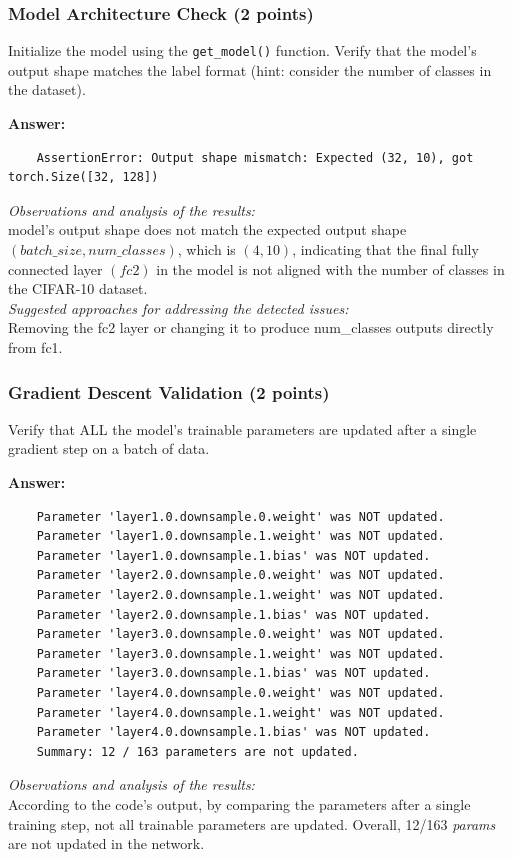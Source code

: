 \documentclass[11pt, oneside]{article}   	%
\begin{document}
\subsubsection*{Model Architecture Check (2 points)}
Initialize the model using the \texttt{get\_model()} function. Verify that the model’s output shape matches the label format (hint: consider the number of classes in the dataset).

\textbf{Answer:} 
\begin{verbatim}
    AssertionError: Output shape mismatch: Expected (32, 10), got torch.Size([32, 128])
\end{verbatim}
\textit{Observations and analysis of the results: }
\\
model's output shape does not match the expected output shape $(batch\_size, num\_classes)$, which is $(4, 10)$, indicating that the final fully connected layer $(fc2)$ in the model is not aligned with the number of classes in the CIFAR-10 dataset.
\\
\textit{Suggested approaches for addressing the detected issues: }
\\
Removing the fc2 layer or changing it to produce num\_classes outputs directly from fc1.

\subsubsection*{Gradient Descent Validation (2 points)}
Verify that ALL the model's trainable parameters are updated after a single gradient step on a batch of data.

\textbf{Answer:}
\begin{verbatim}
    Parameter 'layer1.0.downsample.0.weight' was NOT updated.
    Parameter 'layer1.0.downsample.1.weight' was NOT updated.
    Parameter 'layer1.0.downsample.1.bias' was NOT updated.
    Parameter 'layer2.0.downsample.0.weight' was NOT updated.
    Parameter 'layer2.0.downsample.1.weight' was NOT updated.
    Parameter 'layer2.0.downsample.1.bias' was NOT updated.
    Parameter 'layer3.0.downsample.0.weight' was NOT updated.
    Parameter 'layer3.0.downsample.1.weight' was NOT updated.
    Parameter 'layer3.0.downsample.1.bias' was NOT updated.
    Parameter 'layer4.0.downsample.0.weight' was NOT updated.
    Parameter 'layer4.0.downsample.1.weight' was NOT updated.
    Parameter 'layer4.0.downsample.1.bias' was NOT updated.
    Summary: 12 / 163 parameters are not updated.
\end{verbatim}
\textit{Observations and analysis of the results: }
\\
According to the code's output, by comparing the parameters after a single training step, not all trainable parameters are updated. Overall, 12/163 \textit{params} are not updated in the network.
\end{document}
